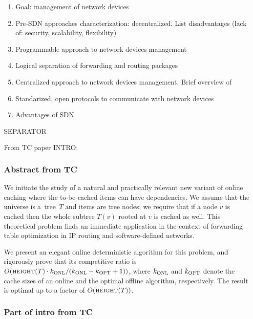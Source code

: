 \begin{enumerate}
  \item Goal: management of network devices
  \item Pre-SDN approaches characterization: decentralized. List disadvantages (lack of: security, scalability, flexibility)
  \item Programmable approach to network devices management
  \item Logical separation of forwarding and routing packages
  \item Centralized approach to network devices management. Brief overview of 
  \item Standarized, open protocols to communicate with network devices
  \item Advantages of SDN
\end{enumerate}


\vspace{1cm}
SEPARATOR
\vspace{1cm}

From TC paper INTRO:
\vspace{1cm}

\subsubsection{Abstract from TC}

We initiate the study of a natural and practically relevant new variant of
online caching where the to-be-cached items can have
dependencies.  We assume that the universe is a~tree~$T$ and items are tree
nodes; we require that if a node $v$ is cached then the whole subtree $T(v)$
rooted at $v$ is cached as well. This theoretical problem finds an immediate
application in the context of forwarding table optimization in IP routing and
software-defined networks.

We present an elegant online deterministic algorithm \ALG for this problem, and 
rigorously prove that its competitive ratio is 
$O(\textsc{height}(T) \cdot k_\textnormal{ONL}/(k_\textnormal{ONL}-k_\textnormal{OPT}+1))$, where $k_\textnormal{ONL}$ and $k_\textnormal{OPT}$
denote the cache sizes of an online and the optimal offline algorithm,
respectively. The result is optimal up to a factor of $O(\textsc{height}(T))$.



\subsubsection{Part of intro from TC}

